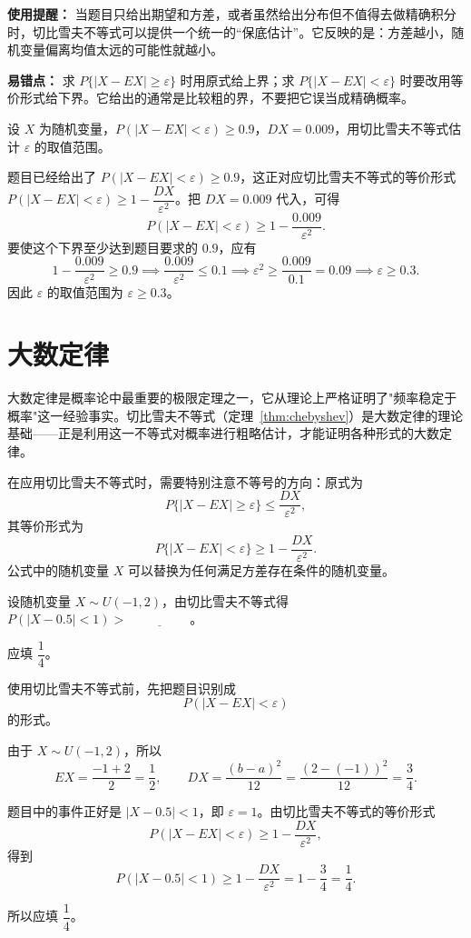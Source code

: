 ﻿\documentclass[lang=cn,11pt]{elegantbook}
\begin{document}
\begin{note}
\textbf{使用提醒：} 当题目只给出期望和方差，或者虽然给出分布但不值得去做精确积分时，切比雪夫不等式可以提供一个统一的“保底估计”。它反映的是：方差越小，随机变量偏离均值太远的可能性就越小。

\textbf{易错点：} 求 \(P\{|X-EX|\ge \varepsilon\}\) 时用原式给上界；求 \(P\{|X-EX|<\varepsilon\}\) 时要改用等价形式给下界。它给出的通常是比较粗的界，不要把它误当成精确概率。
\end{note}

\begin{exercise}\label{exer:4-s10-cheby}
设 \(X\) 为随机变量，\(P(|X - EX| < \varepsilon) \geqslant 0.9\)，\(DX = 0.009\)，用切比雪夫不等式估计 \(\varepsilon\) 的取值范围。
\end{exercise}
\begin{solution}
题目已经给出了 \(P(|X-EX|<\varepsilon)\ge 0.9\)，这正对应切比雪夫不等式的等价形式 \(P(|X-EX|<\varepsilon)\ge 1-\dfrac{DX}{\varepsilon^2}\)。把 \(DX=0.009\) 代入，可得
\[
P(|X-EX|<\varepsilon)\ge 1-\frac{0.009}{\varepsilon^2}.
\]
要使这个下界至少达到题目要求的 \(0.9\)，应有
\[
1-\frac{0.009}{\varepsilon^2}\ge 0.9 \implies \frac{0.009}{\varepsilon^2}\le 0.1 \implies \varepsilon^2\ge \frac{0.009}{0.1}=0.09 \implies \varepsilon\ge 0.3.
\]
因此 \(\varepsilon\) 的取值范围为 \(\varepsilon\ge 0.3\)。
\end{solution}


\section{大数定律}

大数定律是概率论中最重要的极限定理之一，它从理论上严格证明了"频率稳定于概率"这一经验事实。切比雪夫不等式（定理~\ref{thm:chebyshev}）是大数定律的理论基础——正是利用这一不等式对概率进行粗略估计，才能证明各种形式的大数定律。

在应用切比雪夫不等式时，需要特别注意不等号的方向：原式为
\[
P\{|X - EX| \geq \varepsilon\} \leq \frac{DX}{\varepsilon^2},
\]
其等价形式为
\[
P\{|X - EX| < \varepsilon\} \geq 1 - \frac{DX}{\varepsilon^2}.
\]
公式中的随机变量 \(X\) 可以替换为任何满足方差存在条件的随机变量。

\begin{exercise}\label{exer:5-chebyshev-uniform}
设随机变量 \(X \sim U(-1,2)\)，由切比雪夫不等式得 \(P(|X - 0.5| < 1) >\,\underline{\hspace{2cm}}\)。
\end{exercise}
\begin{solution}
应填 \(\dfrac14\)。

使用切比雪夫不等式前，先把题目识别成
\[
P(|X-EX|<\varepsilon)
\]
的形式。

由于 \(X\sim U(-1,2)\)，所以
\[
EX=\frac{-1+2}{2}=\frac12,\qquad DX=\frac{(b-a)^2}{12}=\frac{(2-(-1))^2}{12}=\frac34.
\]

题目中的事件正好是 \(|X-0.5|<1\)，即 \(\varepsilon=1\)。由切比雪夫不等式的等价形式
\[
P(|X-EX|<\varepsilon)\ge 1-\frac{DX}{\varepsilon^2},
\]
得到
\[
P(|X - 0.5| < 1) \geq 1 - \frac{DX}{\varepsilon^2} = 1 - \frac{3}{4} = \frac{1}{4}.
\]

所以应填 \(\dfrac14\)。
\end{solution}
\end{document}
